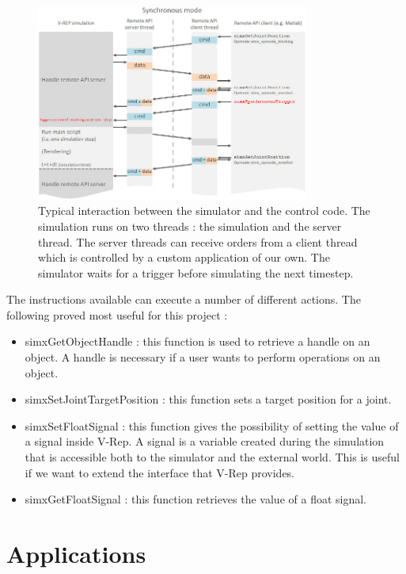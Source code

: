\begin{figure}[htp]
\center
\includegraphics[width=0.8\textwidth]{figures/remoteApiSynchronous}
\caption[Simulation interaction]{Typical interaction between the simulator and the control code. The simulation runs on two threads : the simulation and the server thread. The server threads can receive orders from a client thread which is controlled by a custom application of our own. The simulator waits for a trigger before simulating the next timestep.\cite{vrep_manual}}
\label{fig:remoteApi}
\end{figure}

The instructions available can execute a number of different actions. The following proved most useful for this project :\begin{itemize}
\item simxGetObjectHandle : this function is used to retrieve a handle on an object. A handle is necessary if a user wants to perform operations on an object.
\item simxSetJointTargetPosition : this function sets a target position for a joint.
\item simxSetFloatSignal : this function gives the possibility of setting the value of a signal inside V-Rep. A signal is a variable created during the simulation that is accessible both to the simulator and the external world. This is useful if we want to extend the interface that V-Rep provides.
\item simxGetFloatSignal : this function retrieves the value of a float signal. 
\end{itemize}

\section{Applications}
